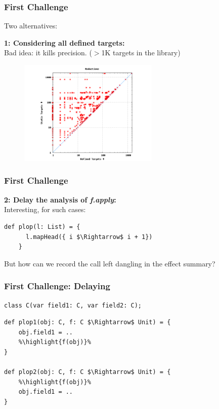 \documentclass[hyperref={pdfpagelabels=false}]{beamer}
\newcommand\highlight[1]{\color{red}{#1}}
\begin{document}
\begin{frame}[fragile]
\frametitle{First Challenge}
    Two alternatives: 
    \vspace{15pt}

    \textbf{1: Considering all defined targets:}\\
    \vspace{5pt}
    Bad idea: it kills precision. ($>$1K targets in the library)

    \begin{figure}[t]
        \includegraphics[height=50mm]{../../report-2012/images/scatter.png}\\
    \end{figure}

\end{frame}

\begin{frame}[fragile]
\frametitle{First Challenge}
    \textbf{2: Delay the analysis of \emph{f.apply}:}\\
    \vspace{5pt}
    Interesting, for such cases:

\begin{lstlisting}[escapechar=\%]
    def plop(l: List) = {
      l.mapHead({ i $\Rightarrow$ i + 1})
    }
\end{lstlisting}

 But how can we record the call left dangling in the effect summary?
\end{frame}

\begin{frame}[fragile]
\frametitle{First Challenge: Delaying}
\begin{lstlisting}[escapechar=\%]
class C(var field1: C, var field2: C);
\end{lstlisting}

\begin{lstlisting}[escapechar=\%]
def plop1(obj: C, f: C $\Rightarrow$ Unit) = {
    obj.field1 = ..
    %\highlight{f(obj)}%
}

def plop2(obj: C, f: C $\Rightarrow$ Unit) = {
    %\highlight{f(obj)}%
    obj.field1 = ..
}
\end{lstlisting}
    \begin{figure}
    \end{figure}
\end{frame}
\end{document}
